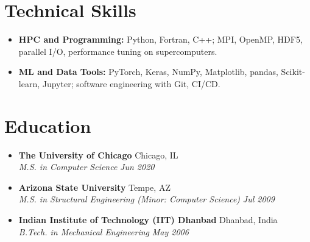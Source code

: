 \documentclass[10pt,letterpaper]{article}
\newcommand{\resumeSubHeadingListStart}{\begin{itemize}[leftmargin=0.15in, label={}]}
\newcommand{\resumeSubHeadingListEnd}{\end{itemize}}
\newcommand{\resumeSubheading}[4]{\item \textbf{\color{subheadingcolor}#1} \hfill {\color{datecolor}#2} \\ \textit{\color{sectioncolor}#3} \hfill \textit{\color{datecolor}#4}}
\begin{document}
\section*{Technical Skills}
\resumeSubHeadingListStart
  \item \textbf{HPC and Programming:} Python, Fortran, C++; MPI, OpenMP, HDF5, parallel I/O, performance tuning on supercomputers.
  \item \textbf{ML and Data Tools:} PyTorch, Keras, NumPy, Matplotlib, pandas, Scikit-learn, Jupyter; software engineering with Git, CI/CD.
\resumeSubHeadingListEnd

\section*{Education}
\resumeSubHeadingListStart
\resumeSubheading{The University of Chicago}{Chicago, IL}{M.S. in Computer Science}{Jun 2020}
\resumeSubheading{Arizona State University}{Tempe, AZ}{M.S. in Structural Engineering (Minor: Computer Science)}{Jul 2009}
\resumeSubheading{Indian Institute of Technology (IIT) Dhanbad}{Dhanbad, India}{B.Tech. in Mechanical Engineering}{May 2006}
\resumeSubHeadingListEnd
\end{document}
